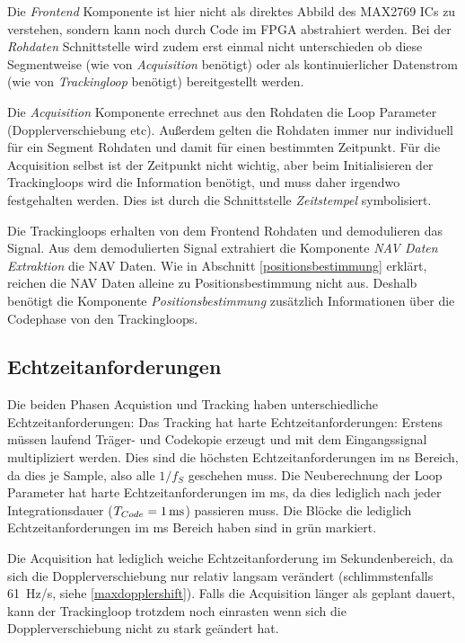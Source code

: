 Die \emph{Frontend} Komponente ist hier nicht als direktes Abbild des MAX2769 ICs zu verstehen, sondern kann noch durch Code im FPGA abstrahiert werden. Bei der \emph{Rohdaten} Schnittstelle wird zudem erst einmal nicht unterschieden ob diese Segmentweise (wie von \emph{Acquisition} benötigt) oder als kontinuierlicher Datenstrom (wie von \emph{Trackingloop} benötigt) bereitgestellt werden. 

Die \emph{Acquisition} Komponente errechnet aus den Rohdaten die Loop Parameter (Dopplerverschiebung etc). Außerdem gelten die Rohdaten immer nur individuell für ein Segment Rohdaten und damit für einen bestimmten Zeitpunkt. Für die Acquisition selbst ist der Zeitpunkt nicht wichtig, aber beim Initialisieren der Trackingloops wird die Information benötigt, und muss daher irgendwo festgehalten werden. Dies ist durch die Schnittstelle \emph{Zeitstempel} symbolisiert.

Die Trackingloops erhalten von dem Frontend Rohdaten und demodulieren das Signal. Aus dem demodulierten Signal extrahiert die Komponente \emph{NAV Daten Extraktion} die NAV Daten. Wie in Abschnitt \ref{positionsbestimmung} erklärt, reichen die NAV Daten alleine zu Positionsbestimmung nicht aus. Deshalb benötigt die Komponente \emph{Positionsbestimmung} zusätzlich Informationen über die Codephase von den Trackingloops.




\subsection{Echtzeitanforderungen} \label{echtzeitanforderungen}
Die beiden Phasen Acquistion und Tracking haben unterschiedliche Echtzeitanforderungen: Das Tracking hat harte Echtzeitanforderungen: Erstens müssen laufend Träger- und Codekopie erzeugt und mit dem Eingangssignal multipliziert werden. Dies sind die höchsten Echtzeitanforderungen im \si{\nano\second} Bereich, da dies je Sample, also alle $1/f_S$ geschehen muss. Die Neuberechnung der Loop Parameter hat harte Echtzeitanforderungen im \si{\milli\second}, da dies lediglich nach jeder Integrationsdauer ($\gpsTcode=\SI{1}{\ms}$) passieren muss. Die Blöcke die lediglich Echtzeitanforderungen im \si{\milli\second} Bereich haben sind in  grün markiert.

Die Acquisition hat lediglich weiche Echtzeitanforderung im Sekundenbereich, da sich die Dopplerverschiebung nur relativ langsam verändert (schlimmstenfalls \SI{61}{\Hz/\second}, siehe \ref{maxdopplershift}). Falls die Acquisition länger als geplant dauert, kann der Trackingloop trotzdem noch einrasten wenn sich die Dopplerverschiebung nicht zu stark geändert hat.

